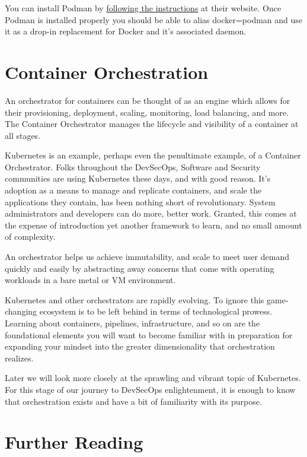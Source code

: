 \justify{}
You can install Podman by 
\href{https://podman.io/getting-started/installation.html}{following the instructions}
at their website. Once Podman is installed properly you
should be able to alias docker=podman and use it as a
drop-in replacement for Docker and it's associated daemon.

\section{Container Orchestration}

\justify{}
An orchestrator for containers can be thought of as an engine which
allows for their provisioning, deployment, scaling, monitoring, load
balancing, and more. The Container Orchestrator manages the
lifecycle and visibility of a container at all stages.

\justify{}
Kubernetes is an example, perhaps even the penultimate example, of a Container Orchestrator.
Folks throughout the DevSecOps, Software and Security communities are using Kubernetes these days, and
with good reason. It's adoption as a means to manage and replicate containers, and scale the applications they contain,
has been nothing short of revolutionary. System administrators and developers can do more, better work. Granted, this comes at
the expense of introduction yet another framework to learn, and no small amount of complexity.

\justify{}
An orchestrator helps us achieve immutability, and scale to meet user demand quickly and easily by abstracting away
concerns that come with operating workloads in a bare metal or VM environment.

\justify{}
Kubernetes and other orchestrators are rapidly evolving. To ignore this
game-changing ecosystem is to be left behind in terms of technological
prowess. Learning about containers, pipelines, infrastructure, and
so on are the foundational elements you will want to become familiar
with in preparation for expanding your mindset into the greater
dimensionality that orchestration realizes.

\justify{}
Later we will look more closely at the sprawling and vibrant topic of Kubernetes. For this stage of our journey to DevSecOps
enlightenment, it is enough to know that orchestration exists and have a bit of familiarity with its purpose.

\section{Further Reading}
